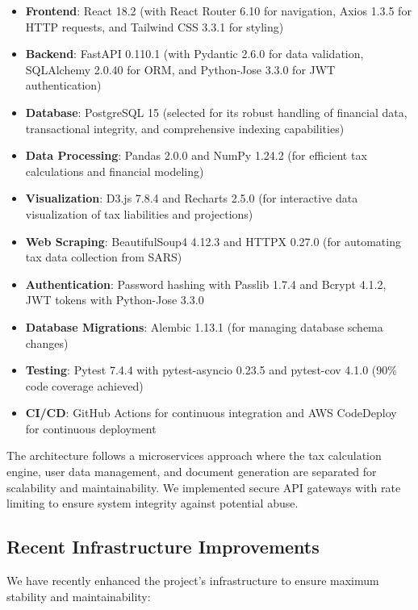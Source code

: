 \documentclass[
  11pt,
  letterpaper,
]{article}
\providecommand{\tightlist}{%
  \setlength{\itemsep}{0pt}\setlength{\parskip}{0pt}}\usepackage{longtable,booktabs,array}
\begin{document}
\begin{itemize}
\tightlist
\item
  \textbf{Frontend}: React 18.2 (with React Router 6.10 for navigation,
  Axios 1.3.5 for HTTP requests, and Tailwind CSS 3.3.1 for styling)
\item
  \textbf{Backend}: FastAPI 0.110.1 (with Pydantic 2.6.0 for data
  validation, SQLAlchemy 2.0.40 for ORM, and Python-Jose 3.3.0 for JWT
  authentication)
\item
  \textbf{Database}: PostgreSQL 15 (selected for its robust handling of
  financial data, transactional integrity, and comprehensive indexing
  capabilities)
\item
  \textbf{Data Processing}: Pandas 2.0.0 and NumPy 1.24.2 (for efficient
  tax calculations and financial modeling)
\item
  \textbf{Visualization}: D3.js 7.8.4 and Recharts 2.5.0 (for
  interactive data visualization of tax liabilities and projections)
\item
  \textbf{Web Scraping}: BeautifulSoup4 4.12.3 and HTTPX 0.27.0 (for
  automating tax data collection from SARS)
\item
  \textbf{Authentication}: Password hashing with Passlib 1.7.4 and
  Bcrypt 4.1.2, JWT tokens with Python-Jose 3.3.0
\item
  \textbf{Database Migrations}: Alembic 1.13.1 (for managing database
  schema changes)
\item
  \textbf{Testing}: Pytest 7.4.4 with pytest-asyncio 0.23.5 and
  pytest-cov 4.1.0 (90\% code coverage achieved)
\item
  \textbf{CI/CD}: GitHub Actions for continuous integration and AWS
  CodeDeploy for continuous deployment
\end{itemize}

The architecture follows a microservices approach where the tax
calculation engine, user data management, and document generation are
separated for scalability and maintainability. We implemented secure API
gateways with rate limiting to ensure system integrity against potential
abuse.

\hypertarget{recent-infrastructure-improvements}{%
\subsection{Recent Infrastructure
Improvements}\label{recent-infrastructure-improvements}}

We have recently enhanced the project's infrastructure to ensure maximum
stability and maintainability:
\end{document}
